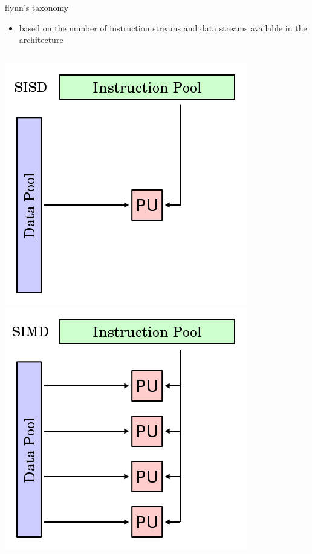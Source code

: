 \documentclass[10pt, t]{beamer}
\begin{document}
  \begin{frame}{flynn's taxonomy}
    \begin{itemize}
      \item based on the number of instruction streams and data streams
        available in the architecture
    \end{itemize}
    \vspace{1ex}
    \begin{columns}
      \begin{column}{.27\textwidth}
        \centering
        \includegraphics[width=\textwidth]{SISD.png}\\
        \includegraphics[width=\textwidth]{SIMD.png}

\end{column}
\end{columns}
\end{frame}
\end{document}
